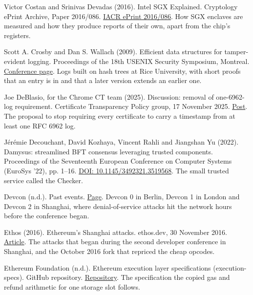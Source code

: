 \documentclass[11pt,twoside]{article}
\theoremstyle{thielethm}
\theoremstyle{thieledef}
\theoremstyle{thieledef}
\theoremstyle{thieledef}
\theoremstyle{thielethm}
\theoremstyle{thieleobs}
\theoremstyle{thielethm}
\begin{document}
\noindent Victor Costan and Srinivas Devadas (2016). Intel SGX Explained. Cryptology ePrint Archive, Paper 2016/086. \href{https://eprint.iacr.org/2016/086}{IACR ePrint 2016/086}. How SGX enclaves are measured and how they produce reports of their own, apart from the chip's registers.
\par\medskip

\noindent Scott A. Crosby and Dan S. Wallach (2009). Efficient data structures for tamper-evident logging. Proceedings of the 18th USENIX Security Symposium, Montreal. \href{https://www.usenix.org/conference/usenixsecurity09/technical-sessions/presentation/efficient-data-structures-tamper-evident}{Conference page}. Logs built on hash trees at Rice University, with short proofs that an entry is in and that a later version extends an earlier one.
\par\medskip

\noindent Joe DeBlasio, for the Chrome CT team (2025). Discussion: removal of one-6962-log requirement. Certificate Transparency Policy group, 17 November 2025. \href{https://groups.google.com/a/chromium.org/g/ct-policy/c/amrnTiDFdwM/m/mCyPDc4TAwAJ}{Post}. The proposal to stop requiring every certificate to carry a timestamp from at least one RFC 6962 log.
\par\medskip

\noindent J\'er\'emie Decouchant, David Kozhaya, Vincent Rahli and Jiangshan Yu (2022). Damysus: streamlined BFT consensus leveraging trusted components. Proceedings of the Seventeenth European Conference on Computer Systems (EuroSys '22), pp. 1--16. \href{https://doi.org/10.1145/3492321.3519568}{DOI: 10.1145/3492321.3519568}. The small trusted service called the Checker.
\par\medskip

\noindent Devcon (n.d.). Past events. \href{https://devcon.org/en/past-events/}{Page}. Devcon 0 in Berlin, Devcon 1 in London and Devcon 2 in Shanghai, where denial-of-service attacks hit the network hours before the conference began.
\par\medskip

\noindent Ethos (2016). Ethereum's Shanghai attacks. ethos.dev, 30 November 2016. \href{https://ethos.dev/shanghai-attacks}{Article}. The attacks that began during the second developer conference in Shanghai, and the October 2016 fork that repriced the cheap opcodes.
\par\medskip

\noindent Ethereum Foundation (n.d.). Ethereum execution layer specifications (execution-specs). GitHub repository. \href{https://github.com/ethereum/execution-specs}{Repository}. The specification the copied gas and refund arithmetic for one storage slot follows.
\par\medskip
\end{document}
